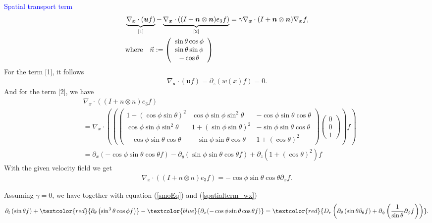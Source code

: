 \begin{frame}
	\scriptsize
	\textcolor{blue}{Spatial transport term}
	\begin{align*}
		&\underbrace{\nabla_{\boldsymbol{x}} \cdot(\boldsymbol{u} f)}_{[1]} -\underbrace{\nabla_{\boldsymbol{x}} \cdot\left((I+\boldsymbol{n} \otimes \boldsymbol{n}) e_3 f\right)}_{[2]} = \gamma \nabla_{\boldsymbol{x}} \cdot(I+\boldsymbol{n} \otimes \boldsymbol{n}) \nabla_{\boldsymbol{x}} f,\\
		\vspace{1em}
        &\text{where} \quad \vec{n} :=\left(\begin{array}{c}\sin \theta \cos \phi \\ \sin \theta \sin \phi \\ -\cos \theta\end{array}\right)
	\end{align*}
\pause
For the term [1], it follows
	\begin{align*}
	\nabla_{\boldsymbol{x}}\cdot(\boldsymbol{u} f) = \partial_z (w(x)f) = 0.
	\end{align*}
\pause
And for the term [2], we have
\begin{align*}
	&\nabla_x \cdot ((I+n \otimes n)e_3f) \\
	&= \nabla_x \cdot \left(\left(\left(\begin{array}{ccc}
		1+(\cos \phi \sin \theta)^2 & \cos \phi \sin \phi \sin^2 \theta & -\cos\phi \sin\theta \cos\theta \\
		\cos \phi \sin\phi \sin^2\theta & 1+(\sin\phi \sin\theta)^2 & -\sin\phi \sin\theta \cos\theta \\
		-\cos\phi \sin\theta \cos\theta & -\sin\phi \sin\theta \cos\theta & 1+(\cos \theta)^2
	\end{array}\right) \left(\begin{array}{c} 0\\ 0\\1 \end{array}\right) \right)f \right) \\
	&= \partial_x (-\cos\phi \sin\theta \cos\theta f) - \partial_y (\sin\phi \sin\theta \cos\theta f) + \partial_z(1+(\cos \theta)^2) f
\end{align*}
With the given velocity field we get
\begin{align}
	\nabla_x \cdot ((I+n \otimes n)e_3f) = -\cos\phi \sin\theta \cos\theta \partial_x f. \label{spatialterm_wx}
\end{align}
\end{frame}
\begin{frame}
\scriptsize
	Assuming $\gamma = 0$, we have together with equation (\ref{smoEq}) and (\ref{spatialterm_wx})
	\begin{align}
		\partial_{t}\left(\sin \theta f\right)+ \textcolor{red}{\partial_\theta\left( \sin ^3 \theta \cos \phi f\right)} - \textcolor{blue}{\partial_x(-\cos\phi \sin\theta \cos\theta f)}
		= \textcolor{red}{D_{r}\left(\partial_\theta \left(\sin \theta \partial_\theta f\right)+ \partial_\phi\left(\frac{1}{\sin \theta} \partial_\phi f\right)\right)}.
	\end{align}
\end{frame}
